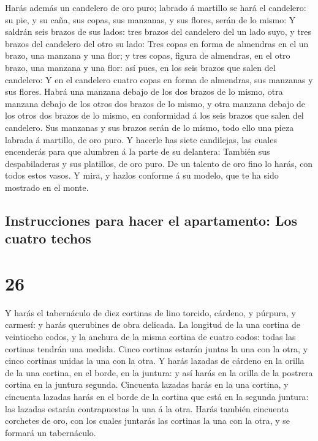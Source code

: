  Harás además un candelero de oro puro; labrado á
martillo se hará el candelero: su pie, y su caña, sus copas, sus
manzanas, y sus flores, serán de lo mismo:  Y saldrán
seis brazos de sus lados: tres brazos del candelero del un lado suyo, y
tres brazos del candelero del otro su lado:  Tres copas
en forma de almendras en el un brazo, una manzana y una flor; y tres
copas, figura de almendras, en el otro brazo, una manzana y una flor:
así pues, en los seis brazos que salen del candelero:  Y
en el candelero cuatro copas en forma de almendras, sus manzanas y sus
flores.  Habrá una manzana debajo de los dos brazos de lo
mismo, otra manzana debajo de los otros dos brazos de lo mismo, y otra
manzana debajo de los otros dos brazos de lo mismo, en conformidad á los
seis brazos que salen del candelero.  Sus manzanas y sus
brazos serán de lo mismo, todo ello una pieza labrada á martillo, de oro
puro.  Y hacerle has siete candilejas, las cuales
encenderás para que alumbren á la parte de su delantera: 
También sus despabiladeras y sus platillos, de oro puro. 
De un talento de oro fino lo harás, con todos estos vasos.
 Y mira, y hazlos conforme á su modelo, que te ha sido
mostrado en el monte.

\hypertarget{instrucciones-para-hacer-el-apartamento-los-cuatro-techos}{%
\subsection{Instrucciones para hacer el apartamento: Los cuatro
techos}\label{instrucciones-para-hacer-el-apartamento-los-cuatro-techos}}

\hypertarget{section-25}{%
\section{26}\label{section-25}}

 Y harás el tabernáculo de diez cortinas de lino torcido,
cárdeno, y púrpura, y carmesí: y harás querubines de obra delicada.
 La longitud de la una cortina de veintiocho codos, y la
anchura de la misma cortina de cuatro codos: todas las cortinas tendrán
una medida.  Cinco cortinas estarán juntas la una con la
otra, y cinco cortinas unidas la una con la otra.  Y harás
lazadas de cárdeno en la orilla de la una cortina, en el borde, en la
juntura: y así harás en la orilla de la postrera cortina en la juntura
segunda.  Cincuenta lazadas harás en la una cortina, y
cincuenta lazadas harás en el borde de la cortina que está en la segunda
juntura: las lazadas estarán contrapuestas la una á la otra.
 Harás también cincuenta corchetes de oro, con los cuales
juntarás las cortinas la una con la otra, y se formará un tabernáculo.

